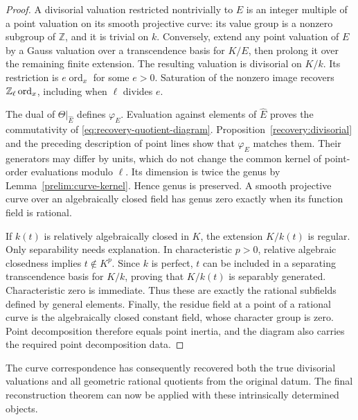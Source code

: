 \begin{proof}
A divisorial valuation restricted nontrivially to $E$ is an integer
multiple of a point valuation on its smooth projective curve: its
value group is a nonzero subgroup of $\mathbb Z$, and it is trivial
on $k$. Conversely, extend any point valuation of $E$ by a Gauss
valuation over a transcendence basis for $K/E$, then prolong it over
the remaining finite extension. The resulting valuation is
divisorial on $K/k$. Its restriction is $e\operatorname{ord}_x$ for
some $e>0$. Saturation of the nonzero image recovers
$\mathbb Z_\ell\operatorname{ord}_x$, including when $\ell$ divides $e$.

The dual of $\Theta|_{\widehat E}$ defines $\varphi_E$.
Evaluation against elements of $\widehat E$ proves the commutativity
of \eqref{eq:recovery-quotient-diagram}. Proposition~\ref{recovery:divisorial}
and the preceding description of point lines show that $\varphi_E$
matches them. Their generators may differ by units, which do not
change the common kernel of point-order evaluations modulo $\ell$.
Its dimension is twice the genus by Lemma~\ref{prelim:curve-kernel}.
Hence genus is preserved. A smooth projective curve over an
algebraically closed field has genus zero exactly when its function
field is rational.

If $k(t)$ is relatively algebraically closed in $K$, the extension
$K/k(t)$ is regular. Only separability needs explanation. In
characteristic $p>0$, relative algebraic closedness implies
$t\notin K^p$. Since $k$ is perfect, $t$ can be included in a
separating transcendence basis for $K/k$, proving that $K/k(t)$ is
separably generated. Characteristic zero is immediate. Thus these
are exactly the rational subfields defined by general elements.
Finally, the residue field at a point of a rational curve is the
algebraically closed constant field, whose character group is zero.
Point decomposition therefore equals point inertia, and the diagram
also carries the required point decomposition data.
\end{proof}

The curve correspondence has consequently recovered both the true
divisorial valuations and all geometric rational quotients from the
original datum. The final reconstruction theorem can now be applied
with these intrinsically determined objects.
